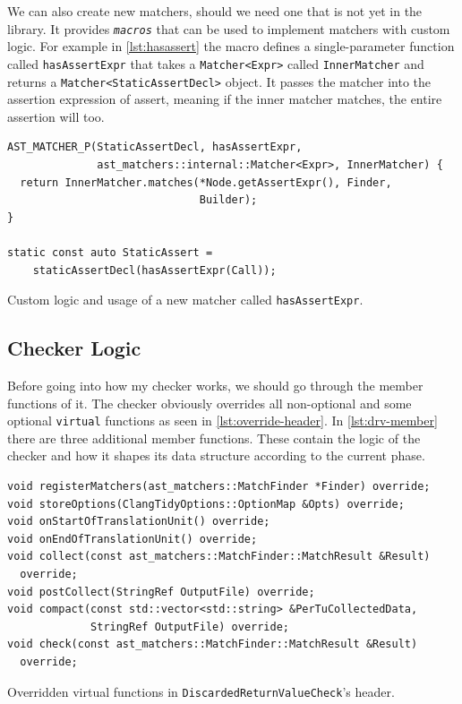 We can also create new matchers, should we need one that is not yet in the library. %
It provides \emph{\texttt{macros}} that can be used to implement matchers with custom logic. For example in \cref{lst:hasassert} the
macro defines a single-parameter function called \texttt{hasAssertExpr} that takes a \texttt{Matcher<Expr>} called
\texttt{InnerMatcher} and returns a \texttt{Matcher<StaticAssertDecl>} object. It passes the
matcher into the assertion expression of assert, meaning if the inner matcher matches, the entire assertion will too.

\begin{listing}[H]
  \begin{verbatim}
AST_MATCHER_P(StaticAssertDecl, hasAssertExpr,
              ast_matchers::internal::Matcher<Expr>, InnerMatcher) {
  return InnerMatcher.matches(*Node.getAssertExpr(), Finder,
                              Builder);
}

static const auto StaticAssert =
    staticAssertDecl(hasAssertExpr(Call));
  \end{verbatim}
  \caption{Custom logic and usage of a new matcher called \texttt{hasAssertExpr}.}\label{lst:hasassert}
\end{listing}


\subsection{Checker Logic}

Before going into how my checker works, we should go through the member functions of it. The checker obviously overrides all
non-optional and some optional \texttt{virtual} functions as seen in \cref{lst:override-header}. In \cref{lst:drv-member}
there are three additional member functions. These contain the logic of the checker and how it shapes
its data structure according to the current phase. 

\begin{listing}[H]
  \begin{verbatim}
void registerMatchers(ast_matchers::MatchFinder *Finder) override;
void storeOptions(ClangTidyOptions::OptionMap &Opts) override;
void onStartOfTranslationUnit() override;
void onEndOfTranslationUnit() override;
void collect(const ast_matchers::MatchFinder::MatchResult &Result)
  override;
void postCollect(StringRef OutputFile) override;
void compact(const std::vector<std::string> &PerTuCollectedData,
             StringRef OutputFile) override;
void check(const ast_matchers::MatchFinder::MatchResult &Result)
  override;
  \end{verbatim}
  \caption{Overridden virtual functions in \texttt{DiscardedReturnValueCheck}'s header.}\label{lst:override-header}
\end{listing}

